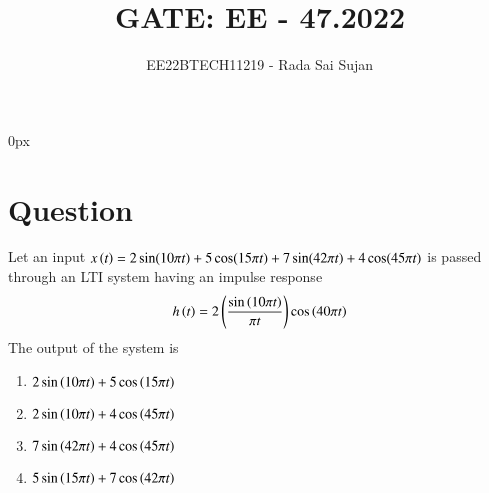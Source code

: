 \documentclass[journal,12pt,twocolumn]{IEEEtran}
\theoremstyle{remark}
\begin{document}
\parindent 0px

\title{GATE: EE - 47.2022}
\author{EE22BTECH11219 - Rada Sai Sujan$^{}$%
}
\maketitle
\newpage
\bigskip
\section*{Question}
Let an input $x\left(t\right)=2\sin (10\pi t )+5\cos (15\pi t)+7\sin(42\pi t)+4\cos (45\pi t)$ is passed through an LTI system having an impulse response $$h\left(t\right)=2\left(\frac{\sin\left(10\pi t\right)}{\pi t}\right)\cos \left(40\pi t\right)$$ The output of the system is \\
\begin{enumerate}[label=(\alph*)]
    \item $2\sin\left(10\pi t\right)+5\cos\left(15\pi t\right)$
    \item $2\sin\left(10\pi t\right)+4\cos\left(45\pi t\right)$
    \item $7\sin\left(42\pi t\right)+4\cos\left(45\pi t\right)$
    \item $5\sin\left(15\pi t\right)+7\cos\left(42\pi t\right)$
\end{enumerate}
\solution
\end{document}

